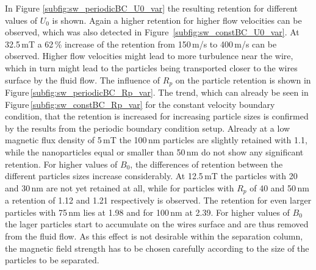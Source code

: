 In Figure \ref{subfig:sw_periodicBC_U0_var} the resulting retention for different values of  $U_{0}$ is shown. Again a higher retention for higher flow velocities can be observed, which was also detected in Figure \,\ref{subfig:sw_constBC_U0_var}. At 32.5\,mT a 62\,\% increase of the retention from 150\,\textmu m/s to 400\,\textmu m/s can be observed. Higher flow velocities might lead to more turbulence near the wire, which in turn might lead to the particles being transported closer to the wires surface by the fluid flow. The influence of $R_{p}$ on the particle retention is shown in Figure\,\ref{subfig:sw_periodicBC_Rp_var}. The trend, which can already be seen in Figure\,\ref{subfig:sw_constBC_Rp_var} for the constant velocity boundary condition, that the retention is increased for increasing particle sizes is confirmed by the results from the periodic boundary condition setup. Already at a low magnetic flux density of 5\,mT the 100\,nm particles are slightly retained with 1.1, while the nanoparticles equal or smaller than 50\,nm do not show any significant retention. For higher values of $B_{0}$, the differences of retention between the different particles sizes increase considerably. At 12.5\,mT the particles with 20 and 30\,nm are not yet retained at all, while for particles with $R_{p}$ of 40 and 50\,nm a retention of 1.12 and 1.21 respectively is observed. The retention for even larger particles with 75\,nm lies at 1.98 and for 100\,nm at 2.39. For higher values of $B_{0}$ the lager particles start to accumulate on the wires surface and are thus removed from the fluid flow. As this effect is not desirable within the separation column, the magnetic field strength has to be chosen carefully according to the size of the particles to be separated.

